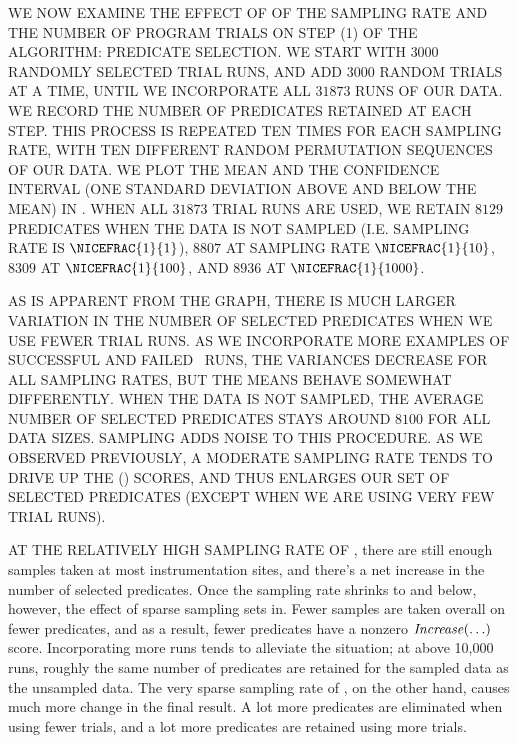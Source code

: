 
WE NOW EXAMINE THE EFFECT OF OF THE SAMPLING RATE AND THE NUMBER OF
PROGRAM TRIALS ON STEP (1) OF THE ALGORITHM: PREDICATE SELECTION.
WE START WITH $3000$ RANDOMLY
SELECTED TRIAL RUNS, AND ADD $3000$ RANDOM TRIALS AT A TIME, UNTIL WE
INCORPORATE ALL $31873$ RUNS OF OUR DATA.  WE RECORD THE NUMBER OF
PREDICATES RETAINED AT EACH STEP.  THIS PROCESS IS REPEATED TEN TIMES
FOR EACH SAMPLING RATE, WITH TEN DIFFERENT RANDOM PERMUTATION SEQUENCES
OF OUR DATA. WE PLOT THE MEAN AND THE CONFIDENCE INTERVAL (ONE
STANDARD DEVIATION ABOVE AND BELOW THE MEAN) IN
.  WHEN ALL $31873$ TRIAL
RUNS ARE USED, WE RETAIN $8129$ PREDICATES WHEN THE DATA IS NOT
SAMPLED (I.E. SAMPLING RATE IS $\NICEFRAC{1}{1}$), $8807$ AT SAMPLING
RATE $\NICEFRAC{1}{10}$, $8309$ AT $\NICEFRAC{1}{100}$, AND $8936$ AT
$\NICEFRAC{1}{1000}$.

  \HSPACE{\COLUMNSEP}

AS IS APPARENT FROM THE GRAPH, THERE IS MUCH LARGER VARIATION IN THE
NUMBER OF SELECTED PREDICATES WHEN WE USE FEWER TRIAL RUNS.
AS WE INCORPORATE MORE EXAMPLES OF SUCCESSFUL AND FAILED \MOSS\ RUNS,
THE VARIANCES DECREASE FOR ALL SAMPLING RATES, BUT THE MEANS BEHAVE
SOMEWHAT DIFFERENTLY.  WHEN THE DATA IS NOT SAMPLED, THE AVERAGE
NUMBER OF SELECTED PREDICATES STAYS AROUND $8100$ FOR ALL DATA SIZES.
SAMPLING ADDS NOISE TO THIS PROCEDURE.  AS WE OBSERVED PREVIOUSLY,
A MODERATE SAMPLING RATE TENDS TO DRIVE UP THE \INCREASE() SCORES, AND
THUS ENLARGES OUR SET OF SELECTED PREDICATES (EXCEPT WHEN WE ARE USING
VERY FEW TRIAL RUNS).

AT THE RELATIVELY HIGH SAMPLING RATE OF
, there are still enough samples taken at most
instrumentation sites, and there's a net increase in the number of
selected predicates.  Once the sampling rate shrinks to
 and below, however, the effect of sparse
sampling sets in.  Fewer samples are taken overall on fewer predicates,
and as a result, fewer predicates have a nonzero $\mbox{\textit{Increase}}(\ldots)$ score.
Incorporating more runs tends to alleviate the situation; at above
10,000 runs, roughly the same number of predicates are retained for
the  sampled data as the unsampled data.  The very
sparse sampling rate of , on the other hand,
causes much more change in the final result.  A lot more predicates
are eliminated when using fewer trials, and a lot more predicates are
retained using more trials.


